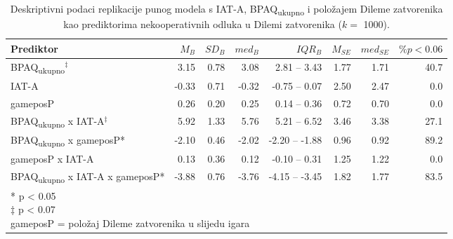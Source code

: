 \documentclass[a4paper, 12pt]{report}
\begin{document}
\begin{appendices}
\begin{table}
    \begin{center}
        \caption{\label{deskr p robust} Deskriptivni podaci replikacije punog
            modela s IAT-A, BPAQ\textsubscript{ukupno} i položajem Dileme
            zatvorenika kao prediktorima nekooperativnih odluka u Dilemi
            zatvorenika ($k =$ 1000).}
        \hspace*{-0.8cm}\begin{tabular}{lrrrrrrr}
        \toprule
        Prediktor & $M_B$ & $SD_B$ & $med_B$ & $IQR_B$ & $M_{SE}$ & $med_{SE}$
        & $\% p < 0.06$\\
        \midrule
        BPAQ\textsubscript{ukupno}$^\ddagger$ & 3.15 & 0.78 & 3.08 & 2.81 -- 3.43 &
        1.77 & 1.71 & 40.7\\
       IAT-A & -0.33 & 0.71 & -0.32 & -0.75 -- 0.07 & 2.50 & 2.47 & 0.0\\
       gameposP & 0.26 & 0.20 & 0.25 & 0.14 -- 0.36 & 0.72 & 0.70 & 0.0\\
       BPAQ\textsubscript{ukupno} x IAT-A$^\ddagger$ & 5.92 & 1.33 & 5.76 & 5.21 -- 6.52 &
        3.46 & 3.38 & 27.1\\
        BPAQ\textsubscript{ukupno} x gameposP* & -2.10 & 0.46 & -2.02 &
        -2.20 -- {-}1.88 & 0.96 & 0.92 & 89.2\\
       gameposP x IAT-A & 0.13 & 0.36 & 0.12 & -0.10 -- 0.31 & 1.25 & 1.22 & 0.0\\
       BPAQ\textsubscript{ukupno} x IAT-A x gameposP* & -3.88 & 0.76 & -3.76 &
        -4.15 -- {-}3.45 & 1.82 & 1.77 & 83.5\\
        \bottomrule
        \multicolumn{6}{l}{
            \parbox{9cm}{\scriptsize \vspace{3pt} 
                * p < 0.05\\
                $\ddagger$ p < 0.07\\
                gameposP = položaj Dileme zatvorenika u slijedu igara
        }}
    \end{tabular}
\end{center}
\end{table}


\end{appendices}
\end{document}
